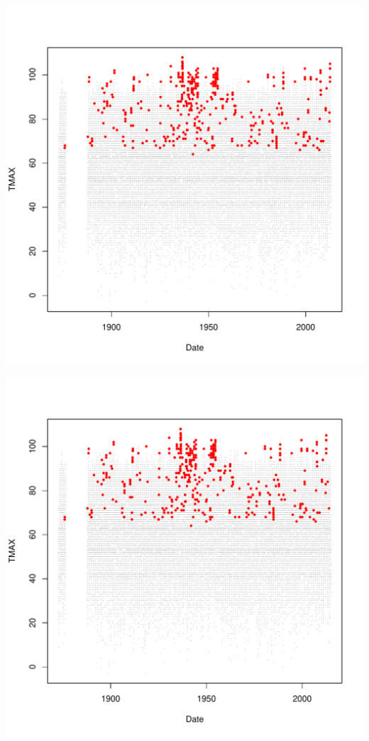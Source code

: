 \documentclass{article}\usepackage[]{graphicx}\usepackage[]{color}
\makeatletter
\def\maxwidth{ %
  \ifdim\Gin@nat@width>\linewidth
    \linewidth
  \else
    \Gin@nat@width
  \fi
}
\newenvironment{knitrout}{}{} %
\makeatother
\begin{document}
\begin{knitrout}
\includegraphics[width=\maxwidth]{figure/unnamed-chunk-4-66} 

\includegraphics[width=\maxwidth]{figure/unnamed-chunk-4-67} 


\end{knitrout}
\end{document}

